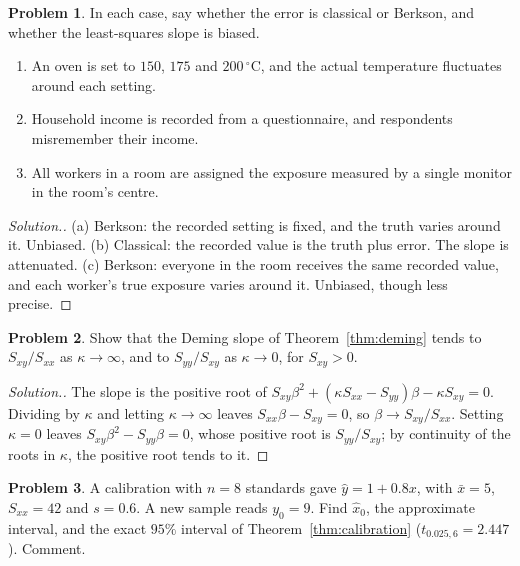 \documentclass[11pt,a4paper]{article}
\numberwithin{equation}{section}
\theoremstyle{definition}
\newtheorem{problemx}{Problem}[subsection]
\newenvironment{problem}{\begin{problemx}}{\end{problemx}}
\newenvironment{solution}
  {\renewcommand{\qedsymbol}{}\begin{proof}[\textit{Solution}.]}
  {\end{proof}}
\begin{document}
\begin{problem}\label{prob:berkson-vs-classical}
In each case, say whether the error is classical or Berkson, and whether the least-squares slope is biased.
\begin{enumerate}[label=(\alph*)]
\item An oven is set to $150$, $175$ and $200\,^\circ$C, and the actual temperature fluctuates around each setting.
\item Household income is recorded from a questionnaire, and respondents misremember their income.
\item All workers in a room are assigned the exposure measured by a single monitor in the room's centre.
\end{enumerate}
\end{problem}

\begin{solution}
(a) Berkson: the recorded setting is fixed, and the truth varies around it. Unbiased.
(b) Classical: the recorded value is the truth plus error. The slope is attenuated.
(c) Berkson: everyone in the room receives the same recorded value, and each worker's true exposure varies around
it. Unbiased, though less precise.
\end{solution}

\begin{problem}\label{prob:deming-limits}
Show that the Deming slope of Theorem~\ref{thm:deming} tends to $S_{xy}/S_{xx}$ as $\kappa \to \infty$, and to $S_{yy}/S_{xy}$ as $\kappa \to 0$, for $S_{xy} > 0$.
\end{problem}

\begin{solution}
The slope is the positive root of $S_{xy}\beta^2 + (\kappa S_{xx} - S_{yy})\beta - \kappa S_{xy} = 0$. Dividing by $\kappa$ and letting $\kappa \to \infty$ leaves
$S_{xx}\beta - S_{xy} = 0$, so $\beta \to S_{xy}/S_{xx}$. Setting $\kappa = 0$ leaves $S_{xy}\beta^2 - S_{yy}\beta = 0$, whose positive root is $S_{yy}/S_{xy}$; by
continuity of the roots in $\kappa$, the positive root tends to it.
\end{solution}

\begin{problem}\label{prob:calibration-g}
A calibration with $n = 8$ standards gave $\hat y = 1 + 0.8x$, with $\bar x = 5$, $S_{xx} = 42$ and $s = 0.6$. A new sample reads $y_0 = 9$.
Find $\hat x_0$, the approximate interval, and the exact $95\%$ interval of Theorem~\ref{thm:calibration} ($t_{0.025,6} = 2.447$). Comment.
\end{problem}
\end{document}
